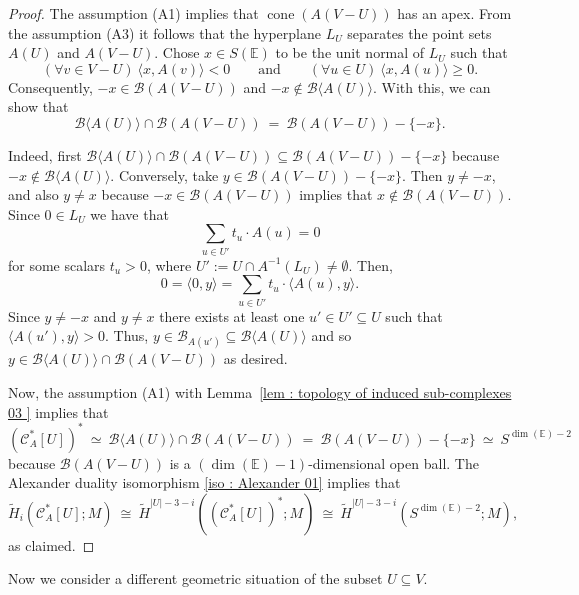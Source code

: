 \documentclass[a4paper,11pt,reqno, english]{amsart}
\theoremstyle{definition}
\theoremstyle{remark}
\newcommand\CC{\mathscr C}
\newcommand\E{\mathbb{E}}
\DeclareMathOperator{\cone}{\mathrm{cone}}
\begin{document}
\begin{proof}
	The assumption (A1) implies that $\cone(A(V-U))$ has an apex.
	From the assumption (A3) it follows that the hyperplane $L_U$ separates the point sets $A(U)$ and $A(V-U)$.
	Chose $x\in S(\E)$ to be the unit normal of $L_U$ such that
	\[
		(\forall v\in V-U)\ \langle x,A(v)\rangle <0
		\qquad\text{and}\qquad
		(\forall u \in U)\ \langle x,A(u)\rangle \geq 0.
	\]
	Consequently, $-x\in \mathscr{B}(A(V-U))$ and $-x\notin \mathscr{B}\langle A(U)\rangle$.
	With this, we can show that
	\[
		\mathscr{B}\langle A(U)\rangle\cap \mathscr{B}(A(V-U))\ = \ \mathscr{B}(A(V-U))-\{-x\}.
	\]

	\medskip
	Indeed, first $\mathscr{B}\langle A(U)\rangle\cap \mathscr{B}(A(V-U))\subseteq  \mathscr{B}(A(V-U))-\{-x\}$ because $-x\notin \mathscr{B}\langle A(U)\rangle$.
	Conversely, take $y\in \mathscr{B}(A(V-U))-\{-x\}$.
	Then $y\neq -x$, and also $y\neq x$ because $-x\in \mathscr{B}(A(V-U))$ implies that $x\notin \mathscr{B}(A(V-U))$.
	Since $0\in L_U$ we have that
	\[
		\sum_{u\in U'} t_u\cdot A(u) = 0
	\]
	for some scalars $t_u>0$, where $U':=U\cap A^{-1}(L_U)\neq \emptyset$.
	Then,
	\[
		0=\langle 0, y\rangle = \sum_{u\in U'} t_u\cdot \langle A(u),y\rangle.
	\]
	Since $y\neq -x$ and $y\neq x$ there exists at least one $u'\in U'\subseteq U$ such that $\langle A(u'),y\rangle>0$.
	Thus, $y\in \mathscr{B}_{A(u')}\subseteq \mathscr{B}\langle A(U)\rangle$ and so $y\in  \mathscr{B}\langle A(U)\rangle\cap \mathscr{B}(A(V-U))$ as desired.

	\medskip
	Now, the assumption (A1) with Lemma~\ref{lem : topology of induced sub-complexes 03 } implies that
	\[
		(\CC_A^*[U])^* \ \simeq \ \mathscr{B}\langle A(U)\rangle\cap \mathscr{B}(A(V-U)) \ = \ \mathscr{B}(A(V-U))-\{-x\} \ \simeq \ S^{\dim(\E)-2}
	\]
	because $\mathscr{B}(A(V-U))$ is a $(\dim(\E)-1)$-dimensional open ball.
	The Alexander duality isomorphism \eqref{iso : Alexander 01} implies that
	\[
		\widetilde{H}_i(\CC_A^*[U];M)\ \cong  \ \widetilde{H}^{|U|-3-i}((\CC_A^*[U])^* ;M)
		\ \cong  \ \widetilde{H}^{|U|-3-i}(S^{\dim(\E)-2} ;M),
	\]
	as claimed.
\end{proof}



\medskip
Now we consider a different  geometric situation of the subset $U\subseteq V$.
\end{document}
